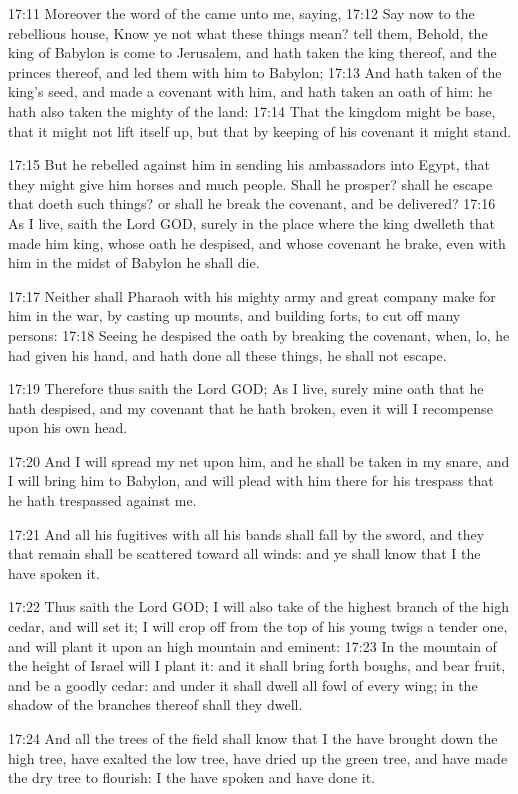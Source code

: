 17:11 Moreover the word of the \LORD came unto me, saying, 17:12 Say
now to the rebellious house, Know ye not what these things mean?  tell
them, Behold, the king of Babylon is come to Jerusalem, and hath taken
the king thereof, and the princes thereof, and led them with him to
Babylon; 17:13 And hath taken of the king's seed, and made a covenant
with him, and hath taken an oath of him: he hath also taken the mighty
of the land: 17:14 That the kingdom might be base, that it might not
lift itself up, but that by keeping of his covenant it might stand.

17:15 But he rebelled against him in sending his ambassadors into
Egypt, that they might give him horses and much people. Shall he
prosper? shall he escape that doeth such things? or shall he break the
covenant, and be delivered?  17:16 As I live, saith the Lord GOD,
surely in the place where the king dwelleth that made him king, whose
oath he despised, and whose covenant he brake, even with him in the
midst of Babylon he shall die.

17:17 Neither shall Pharaoh with his mighty army and great company
make for him in the war, by casting up mounts, and building forts, to
cut off many persons: 17:18 Seeing he despised the oath by breaking
the covenant, when, lo, he had given his hand, and hath done all these
things, he shall not escape.

17:19 Therefore thus saith the Lord GOD; As I live, surely mine oath
that he hath despised, and my covenant that he hath broken, even it
will I recompense upon his own head.

17:20 And I will spread my net upon him, and he shall be taken in my
snare, and I will bring him to Babylon, and will plead with him there
for his trespass that he hath trespassed against me.

17:21 And all his fugitives with all his bands shall fall by the
sword, and they that remain shall be scattered toward all winds: and
ye shall know that I the \LORD have spoken it.

17:22 Thus saith the Lord GOD; I will also take of the highest branch
of the high cedar, and will set it; I will crop off from the top of
his young twigs a tender one, and will plant it upon an high mountain
and eminent: 17:23 In the mountain of the height of Israel will I
plant it: and it shall bring forth boughs, and bear fruit, and be a
goodly cedar: and under it shall dwell all fowl of every wing; in the
shadow of the branches thereof shall they dwell.

17:24 And all the trees of the field shall know that I the \LORD have
brought down the high tree, have exalted the low tree, have dried up
the green tree, and have made the dry tree to flourish: I the \LORD
have spoken and have done it.

